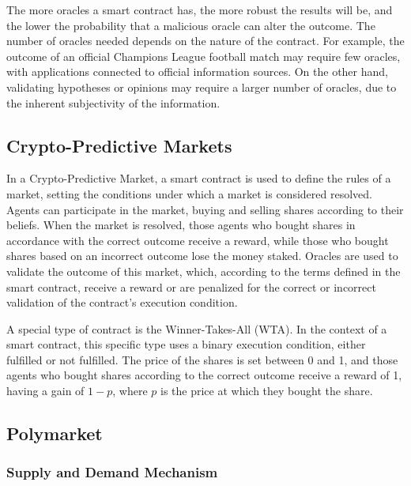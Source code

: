 The more oracles a smart contract has, the more robust the results will be, and the lower the probability that a malicious oracle can alter the outcome. The number of oracles needed depends on the nature of the contract. For example, the outcome of an official Champions League football match may require few oracles, with applications connected to official information sources. On the other hand, validating hypotheses or opinions may require a larger number of oracles, due to the inherent subjectivity of the information.

\subsection{Crypto-Predictive Markets}
\label{subsec:crypto_predictive_markets}

In a Crypto-Predictive Market, a smart contract is used to define the rules of a market, setting the conditions under which a market is considered resolved. Agents can participate in the market, buying and selling shares according to their beliefs. When the market is resolved, those agents who bought shares in accordance with the correct outcome receive a reward, while those who bought shares based on an incorrect outcome lose the money staked. Oracles are used to validate the outcome of this market, which, according to the terms defined in the smart contract, receive a reward or are penalized for the correct or incorrect validation of the contract's execution condition.
    
A special type of contract is the Winner-Takes-All (WTA). In the context of a smart contract, this specific type uses a binary execution condition, either fulfilled or not fulfilled. The price of the shares is set between 0 and 1, and those agents who bought shares according to the correct outcome receive a reward of 1, having a gain of $1-p$, where $p$ is the price at which they bought the share.

\subsection{Polymarket}
\label{subsec:polymarket}


\lipsum[2]

\subsubsection{Supply and Demand Mechanism}
\label{subsubsec:supply_and_demand_mechanism}

\lipsum[2]